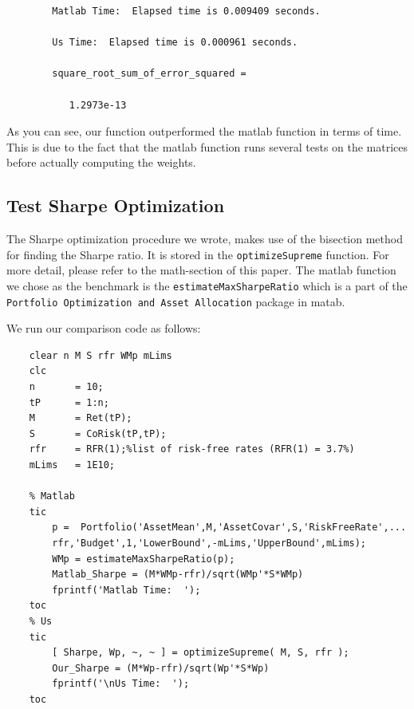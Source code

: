 \documentclass[12pt,titlepage,letter]{article}
\begin{document}
    \color{lightgray} \begin{verbatim}
		Matlab Time:  Elapsed time is 0.009409 seconds.

		Us Time:  Elapsed time is 0.000961 seconds.

		square_root_sum_of_error_squared =

		   1.2973e-13

	\end{verbatim} \color{black}
    \begin{par}
		As you can see, our function outperformed the matlab function in terms of time. This is due to the fact that the matlab function runs several tests on the matrices before actually computing the weights.
	\end{par} \vspace{1em}


	\subsection{Test Sharpe Optimization}

	\begin{par}
	The Sharpe optimization procedure we wrote, makes use of the bisection method for finding the Sharpe ratio. It is stored in the \texttt{optimizeSupreme} function. For more detail, please refer to the math-section of this paper. The matlab function we chose as the benchmark is the \texttt{estimateMaxSharpeRatio} which is a part of the \texttt{Portfolio Optimization and Asset Allocation} package in matab.
	\end{par} \vspace{1em}
	\begin{par}
	We run our comparison code as follows:
	\end{par} \vspace{1em}
	\begin{verbatim}
	clear n M S rfr WMp mLims
	clc
	n       = 10;
	tP      = 1:n;
	M       = Ret(tP);
	S       = CoRisk(tP,tP);
	rfr     = RFR(1);%list of risk-free rates (RFR(1) = 3.7%)
	mLims   = 1E10;

	% Matlab
	tic
	    p =  Portfolio('AssetMean',M,'AssetCovar',S,'RiskFreeRate',...
	    rfr,'Budget',1,'LowerBound',-mLims,'UpperBound',mLims);
	    WMp = estimateMaxSharpeRatio(p);
	    Matlab_Sharpe = (M*WMp-rfr)/sqrt(WMp'*S*WMp)
	    fprintf('Matlab Time:  ');
	toc
	% Us
	tic
	    [ Sharpe, Wp, ~, ~ ] = optimizeSupreme( M, S, rfr );
	    Our_Sharpe = (M*Wp-rfr)/sqrt(Wp'*S*Wp)
	    fprintf('\nUs Time:  ');
	toc
	\end{verbatim}
\end{document}
